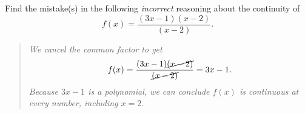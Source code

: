 \documentclass[../main.tex]{subfiles}
\begin{document}
\begin{exercise} \label{ex:continuity-and-cancellation}
  Find the mistake(s) in the following \emph{incorrect} reasoning about the continuity of \[f(x) = \frac{(3x-1)(x-2)}{(x-2)}.\]
  \bigskip

  \begin{quote}
    \itshape
    We cancel the common factor to get
    \[
      f(x) = \frac{(3x - 1)\cancel{(x - 2)}}{\cancel{(x-2)}} = 3x - 1.
    \]
    Because \(3x - 1\) is a polynomial, we can conclude \(f(x)\) is continuous at every number, including \(x=2\).
  \end{quote}

\end{exercise}
\clearpage
\end{document}
